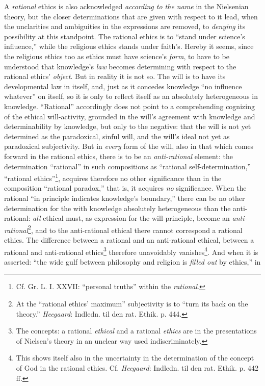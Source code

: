 \documentclass[12pt,a4paper]{book}
\begin{document}
A \emph{rational} ethics is also acknowledged \emph{according to the name} in the Nielsenian theory, but the closer
determinations that are given with respect to it lead, when the unclarities and ambiguities in the
expressions are removed, to \emph{denying} its possibility at this standpoint. The rational ethics is to ``stand
under science's influence,'' while the religious ethics stands under faith's. Hereby it seems, since the
religious ethics too as ethics must have science's \emph{form}, to have to be understood that knowledge's \emph{law}
becomes determining with respect to the rational ethics' \emph{object}. But in reality it is not so. The will is
to have its developmental law in itself, and, just as it concedes knowledge ``no influence whatever'' on
itself, so it is only to reflect itself as an absolutely heterogeneous in knowledge. ``Rational'' accordingly
does not point to a comprehending cognizing of the ethical will-activity, grounded in the will's agreement
with knowledge and determinability by knowledge, but only to the negative: that the will is not yet
determined as the paradoxical, sinful will, and the will's ideal not yet as paradoxical subjectivity. But in
\emph{every} form of the will, also in that which comes forward in the rational ethics, there is to be an
\emph{anti-rational} element: the determination ``rational'' in such compositions as ``rational
self-determination,'' ``rational ethics''\footnote{Cf. Gr. L. I. XXVII: ``personal truths'' within the
\emph{rational}.}, acquires therefore no other significance than in the composition ``rational paradox,'' that is,
it acquires \emph{no} significance. When the rational ``in principle indicates knowledge's boundary,'' there
can be no other determination for the with knowledge absolutely heterogeneous than the anti-rational: \emph{all}
ethical must, as expression for the will-principle, become an \emph{anti-rational}\footnote{At the ``rational
ethics' maximum'' subjectivity is to ``turn its back on the theory.'' \emph{Heegaard}: Indledn. til den rat. Ethik.
p. 444.}, and to the anti-rational ethical there cannot correspond a rational ethics. The difference between
a rational and an anti-rational ethical, between a rational and anti-rational ethics\footnote{The concepts: a
rational \emph{ethical} and a rational \emph{ethics} are in the presentations of Nielsen's theory in an unclear way used
indiscriminately.} therefore unavoidably vanishes\footnote{This shows itself also in the uncertainty in the
determination of the concept of God in the rational ethics. Cf. \emph{Heegaard}: Indledn. til den rat. Ethik. p. 442
ff.}. And when it is asserted: ``the wide gulf between philosophy and religion is \emph{filled out} by ethics,'' in
\end{document}
